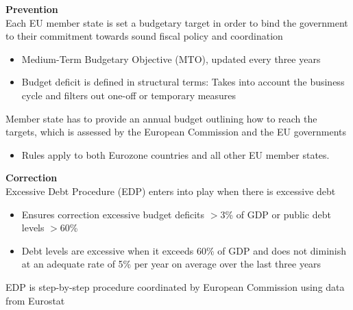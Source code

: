 \documentclass{beamer}
\begin{document}
\begin{frame}
  \textbf{Prevention}\\
    Each EU member state is set a budgetary target in order to bind the government to their commitment towards sound fiscal policy and coordination
    \begin{itemize}
      \item Medium-Term Budgetary Objective (MTO), updated every three years
      \item Budget deficit is defined in structural terms: Takes into account the business cycle and filters out one-off or temporary measures
    \end{itemize}
    Member state has to provide an annual budget outlining how to reach the targets, which is assessed by the European Commission and the EU governments
    \begin{itemize}
      \item Rules apply to both Eurozone countries and all other EU member states.  
    \end{itemize}
\end{frame}

\begin{frame}
  \textbf{Correction}\\
  Excessive Debt Procedure (EDP) enters into play when there is excessive debt 
  \begin{itemize}
    \item Ensures correction excessive budget deficits $>3$\% of GDP or public debt levels $>60$\%
    \item Debt levels are excessive when it exceeds 60\% of GDP and does not diminish at an adequate rate of 5\% per year on average over the last three years
  \end{itemize}
  \medskip
  EDP is step-by-step procedure coordinated by European Commission using data from Eurostat
\end{frame}
\end{document}
